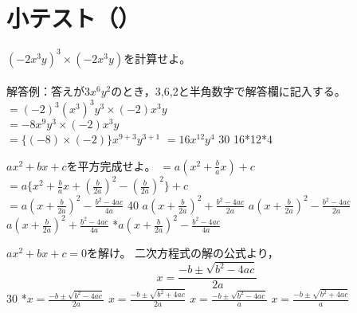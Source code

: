 \newcommand{\Release}{}
\newcommand{\Slide}{}
\newcommand{\PrintLecture}{1}
\newcommand{\PrintSolution}{0}







\maketitle

\section{小テスト（\MyClass）}

\begin{quiz}{\MyClass}

\QuizShortAnswer
{
  $(-2x^3y)^3\times(-2x^3y)$を計算せよ。\\
  　\\%
  解答例：答えが$3x^6y^2$のとき，3,6,2と半角数字で解答欄に記入する。
}
{
  $=(-2)^3(x^3)^3y^3\times(-2)x^3y$\\
  $=-8x^9y^3\times(-2)x^3y$\\
  $=\{(-8)\times(-2)\}x^{9+3}y^{3+1}$
  $=16x^{12}y^4$
}
{30}
{16*12*4}
{}
{}
{}

\QuizMultipleChoices
{
  $ax^2+bx+c$を平方完成せよ。
}
{
  $=a(x^2+\frac{b}{a}x)+c$\\
  $=a\{x^2+\frac{b}{a}x+(\frac{b}{2a})^2-(\frac{b}{2a})^2\}+c$\\
  $=a(x+\frac{b}{2a})^2-\frac{b^2-4ac}{4a}$
}
{40}
{ $a(x+\frac{b}{2a})^2+\frac{b^2-4ac}{2a}$}
{ $a(x+\frac{b}{2a})^2-\frac{b^2-4ac}{2a}$}
{ $a(x+\frac{b}{2a})^2+\frac{b^2-4ac}{4a}$}
{*$a(x+\frac{b}{2a})^2-\frac{b^2-4ac}{4a}$}

\QuizMultipleChoices
{
  $ax^2+bx+c=0$を解け。
}
{
  二次方程式の解の公式より，\\
  \[x=\frac{-b\pm\sqrt{b^2-4ac}}{2a}\]
}
{30}
{*$x=\frac{-b\pm\sqrt{b^2-4ac}}{2a}$}
{ $x=\frac{-b\pm\sqrt{b^2+4ac}}{2a}$}
{ $x=\frac{-b\pm\sqrt{b^2-4ac}}{a}$}
{ $x=\frac{-b\pm\sqrt{b^2+4ac}}{a}$}

\end{quiz}


